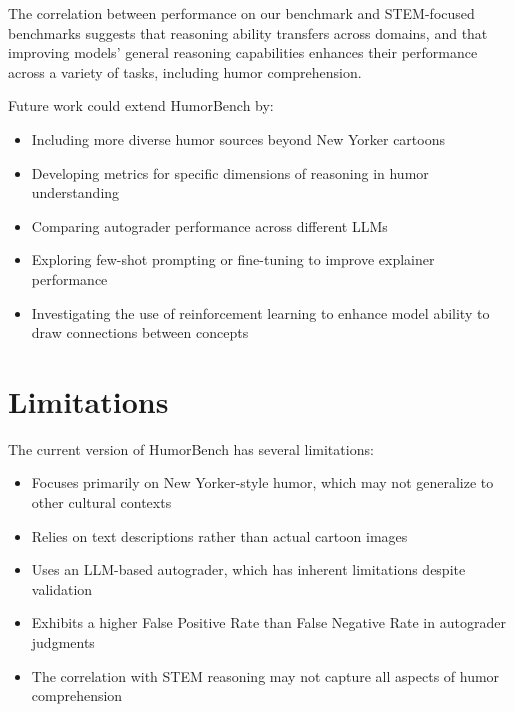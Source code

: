 \documentclass[twocolumn]{article}
\begin{document}
The correlation between performance on our benchmark and STEM-focused benchmarks suggests that reasoning ability transfers across domains, and that improving models' general reasoning capabilities enhances their performance across a variety of tasks, including humor comprehension.

Future work could extend HumorBench by:
\begin{itemize}
    \item Including more diverse humor sources beyond New Yorker cartoons
    \item Developing metrics for specific dimensions of reasoning in humor understanding
    \item Comparing autograder performance across different LLMs
    \item Exploring few-shot prompting or fine-tuning to improve explainer performance
    \item Investigating the use of reinforcement learning to enhance model ability to draw connections between concepts
\end{itemize}

\section*{Limitations}

The current version of HumorBench has several limitations:

\begin{itemize}
    \item Focuses primarily on New Yorker-style humor, which may not generalize to other cultural contexts
    \item Relies on text descriptions rather than actual cartoon images
    \item Uses an LLM-based autograder, which has inherent limitations despite validation
    \item Exhibits a higher False Positive Rate than False Negative Rate in autograder judgments
    \item The correlation with STEM reasoning may not capture all aspects of humor comprehension
\end{itemize}



\end{document}
